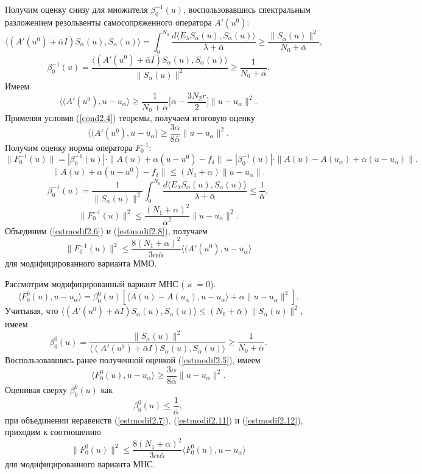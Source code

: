 Получим оценку снизу для множителя $\beta_0^{-1}(u)$, воспользовавшись спектральным разложением резольвенты самосопряженного оператора $A'(u^0)$:
$$\langle (A'(u^0)+\bar{\alpha}I)S_\alpha(u), S_\alpha(u)\rangle=\int_{0}^{N_0}\frac{d\langle E_\lambda S_\alpha(u), S_\alpha(u)\rangle}{\lambda+\bar{\alpha}}\ge\frac{\|S_\alpha(u)\|^2}{N_0+\bar{\alpha}},$$
$$\beta_0^{-1}(u)=\frac{\langle (A'(u^0)+\bar{\alpha}I)S_\alpha(u), S_\alpha(u)\rangle}{\|S_\alpha(u)\|^2}\ge\frac{1}{N_0+\bar{\alpha}}.$$ 
Имеем $$\langle (A'(u^0), u-u_\alpha\rangle\ge\frac{1}{N_0+\bar{\alpha}}\Big[\alpha-\frac{3N_2r}{2}\Big]\|u-u_\alpha\|^2.$$
Применяя условия (\ref{cond2.4}) теоремы, получаем итоговую оценку
\begin{equation}\label{estmodif2.6}
\langle (A'(u^0), u-u_\alpha\rangle\ge\frac{3\alpha}{8\bar{\alpha}}\|u-u_\alpha\|^2.
\end{equation}
Получим оценку нормы оператора $F_0^{-1}$:
$$\|F_0^{-1}(u)\|=|\beta_0^{-1}(u)|\cdot\|A(u)+\alpha(u-u^0)-f_\delta\|=|\beta_0^{-1}(u)|\cdot\|A(u)-A(u_\alpha)+\alpha(u-u_\alpha)\|.$$
\begin{equation}\label{estmodif2.7}
\|A(u)+\alpha(u-u^0)-f_\delta\|\le(N_1+\alpha)\|u-u_\alpha\|.
\end{equation}
$$\beta_0^{-1}(u)=\frac{1}{\|S_\alpha(u)\|^2}\int_{0}^{N_0}\frac{d\langle E_\lambda S_\alpha(u), S_\alpha(u)\rangle}{\lambda + \bar{\alpha}}\le\frac{1}{\bar{\alpha}},$$
\begin{equation}\label{estmodif2.8}
\|F_0^{-1}(u)\|^2\le\frac{(N_1+\alpha)^2}{\bar{\alpha}^2}\|u-u_\alpha\|^2.
\end{equation}
Объединим (\ref{estmodif2.6}) и (\ref{estmodif2.8}), получаем
$$\|F_0^{-1}(u)\|^2\le\frac{8(N_1+\alpha)^2}{3\alpha\bar{\alpha}}\langle (A'(u^0), u-u_\alpha\rangle$$ для модифицированного варианта ММО.

Рассмотрим модифицированный вариант МНС ($\varkappa=0$).
$$\langle F_0^0(u), u-u_\alpha\rangle=\beta_0^0(u)[\langle A(u)-A(u_\alpha), u-u_\alpha\rangle+\alpha\|u-u_\alpha\|^2].$$
Учитывая, что $\langle (A'(u^0)+\bar{\alpha}I)S_\alpha(u), S_\alpha(u)\rangle\le(N_0+\bar{\alpha})\|S_\alpha(u)\|^2$, имеем
$$\beta_0^0(u)=\frac{\|S_\alpha(u)\|^2}{\langle (A'(u^0)+\bar{\alpha}I)S_\alpha(u), S_\alpha(u)\rangle}\ge\frac{1}{N_0+\bar{\alpha}}.$$
Воспользовавшись ранее полученной оценкой (\ref{estmodif2.5}), имеем
\begin{equation}\label{estmodif2.11}
\langle F_0^0(u), u-u_\alpha\rangle\ge\frac{3\alpha}{8\bar{\alpha}}\|u-u_\alpha\|^2.
\end{equation}
Оценивая сверху $\beta_0^0(u)$ как
\begin{equation}\label{estmodif2.12}
\beta_0^0(u)\le\frac{1}{\bar{\alpha}},
\end{equation}
при объединении неравенств (\ref{estmodif2.7}), (\ref{estmodif2.11}) и (\ref{estmodif2.12}), приходим к соотношению
$$\|F_0^0(u)\|^2\le\frac{8(N_1+\alpha)^2}{3\alpha\bar{\alpha}}\langle F_0^0(u), u-u_\alpha\rangle$$ для модифицированного варианта МНС.

